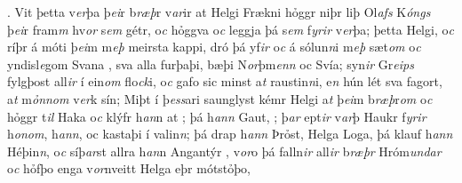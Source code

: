 . 
Vit þetta v\textit{er}þa þ\textit{ei}r b\textit{ræþ}r v\textit{ar}ir at
Helgi  Frækni hỏggr niþr liþ Ol\textit{afs} K\textit{óngs}
þ\textit{ei}r   fram\textit{m} hv\textit{or} s\textit{em}  gétr, o\textit{c} hỏggva o\textit{c} leggja þá s\textit{em}
f\textit{yrir} v\textit{er}þa; þetta   Helgi, o\textit{c} ríþr á móti þ\textit{ei}m m\textit{eþ} meirsta
kappi, dró  þá yf\textit{ir}  o\textit{c}  á sólun\textit{n}i m\textit{eþ} sæt\textit{om} o\textit{c}
yndisl\textit{e}gom Svana  , sva alla furþaþi, bæþi N\textit{or}þm\textit{enn} oc  Svía;
syn\textit{ir} Gr\textit{eips} fylgþost all\textit{ir}  í ein\textit{om} flo\textit{ck}i, o\textit{c} gafo sic  minst
a\textit{t}  raustin\textit{n}i, 
e\textit{n} hún lét sva fagort, a\textit{t} m\textit{ỏnnom}  v\textit{er}k sín; 
Miþt í þ\textit{ess}ari saunglyst kémr 
Helgi a\textit{t} þ\textit{ei}m b\textit{ræþ}r\textit{om} o\textit{c} hỏggr
t\textit{il} Haka o\textit{c}  klýfr  h\textit{an}n at  ; þá   h\textit{ann} Gaut,  ; þ\textit{ar} ept\textit{ir} v\textit{ar}þ Haukr
f\textit{yrir} h\textit{onom},    h\textit{ann}, oc  kastaþi   í valin\textit{n}; þá drap h\textit{ann} Þrỏst,   Helga   Loga, 
þá klauf h\textit{ann} Héþin\textit{n}, o\textit{c} síþ\textit{ar}st allra    h\textit{an}n  Angantýr  , v\textit{or}o þá falln\textit{ir} all\textit{ir} b\textit{ræþr}
Hróm\textit{undar} o\textit{c} hỏfþo enga v\textit{or}nveitt Helga eþr mótstỏþo,
